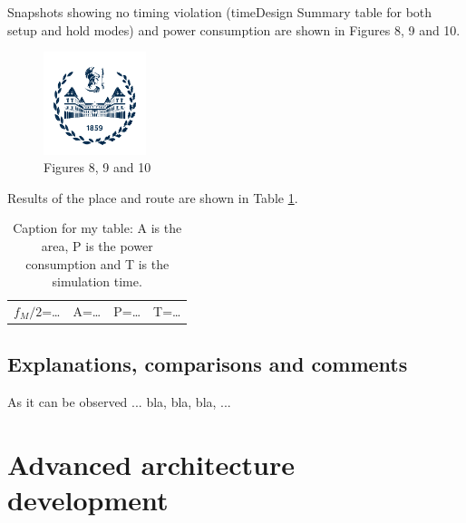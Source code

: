 Snapshots showing no timing violation (timeDesign Summary table for both setup and hold modes) and power consumption are shown in Figures 8, 9 and 10.

\begin{figure}[h]
  \centering
  \includegraphics[width=3cm]{./logopoli_new}
  \caption{Figures 8, 9 and 10}
\end{figure}

Results of the place and route are shown in Table \ref{tab:cap1:tab3}.

\begin{table}
  \centering  
  \caption{Caption for my table: A is the area, P is the power consumption and T is the simulation time.}
  \label{tab:cap1:tab3}
  \begin{tabular}{c|c|c|c}
    $f_M/2$=\dots & A=\dots & P=\dots & T=\dots \\
  \end{tabular}
\end{table}

\subsection{Explanations, comparisons and comments}

As it can be observed ... bla, bla, bla, ...

\section{Advanced architecture development}

